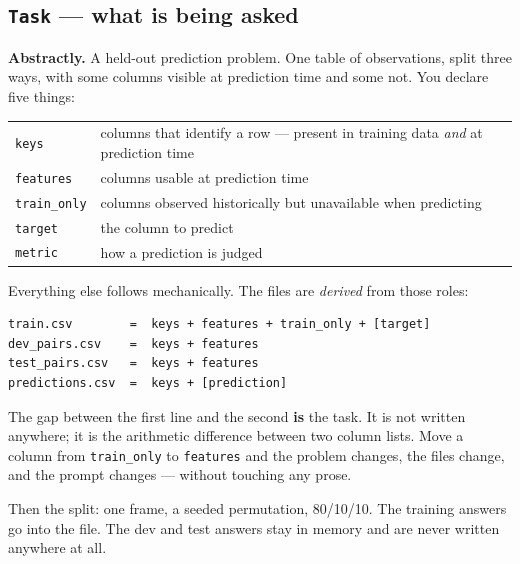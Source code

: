 \documentclass[11pt]{article}
\newcommand{\keyidea}[1]{\begin{idea}#1\end{idea}}
\newcommand{\runin}[1]{\smallskip\noindent\textbf{#1}\quad}
\begin{document}

\subsection{\texttt{Task} --- what is being asked}

\runin{Abstractly.}
A held-out prediction problem. One table of observations, split three ways, with some columns
visible at prediction time and some not. You declare five things:

\begin{center}
\begin{tabularx}{\textwidth}{@{}l X@{}}
\toprule
\texttt{keys} & columns that identify a row --- present in training data \emph{and} at
  prediction time \\
\texttt{features} & columns usable at prediction time \\
\texttt{train\_only} & columns observed historically but unavailable when predicting \\
\texttt{target} & the column to predict \\
\texttt{metric} & how a prediction is judged \\
\bottomrule
\end{tabularx}
\end{center}

\noindent Everything else follows mechanically. The files are \emph{derived} from those roles:

\begin{lstlisting}
train.csv        =  keys + features + train_only + [target]
dev_pairs.csv    =  keys + features
test_pairs.csv   =  keys + features
predictions.csv  =  keys + [prediction]
\end{lstlisting}

\keyidea{The gap between the first line and the second \textbf{is} the task. It is not written
anywhere; it is the arithmetic difference between two column lists. Move a column from
\texttt{train\_only} to \texttt{features} and the problem changes, the files change, and the
prompt changes --- without touching any prose.}

\noindent Then the split: one frame, a seeded permutation, 80/10/10. The training answers go into
the file. The dev and test answers stay in memory and are never written anywhere at all.
\end{document}
